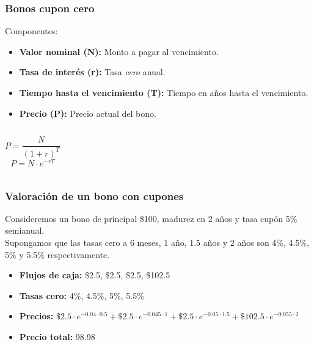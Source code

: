 
\begin{frame}
    \frametitle{Bonos cupon cero}
    Componentes:
    \begin{itemize}
        \item \textbf{Valor nominal (N):} Monto a pagar al vencimiento.
        \item \textbf{Tasa de interés (r):} Tasa \textit{cero} anual.
        \item \textbf{Tiempo hasta el vencimiento (T):} Tiempo en años hasta el vencimiento.
        \item \textbf{Precio (P):} Precio actual del bono.
    \end{itemize}
    \begin{columns}
            \begin{equation*}
                P = \frac{N}{(1+r)^T}
            \end{equation*}
            \begin{equation*}
                P = N \cdot e^{-rT}
            \end{equation*}
    \end{columns}
\end{frame}


\begin{frame}
    \frametitle{Valoración de un bono con cupones}
    Consideremos un bono de principal \$100, madurez en 2 años y tasa cupón 5\% semianual.\\
    Supongamos que las tasas cero a 6 meses, 1 año, 1.5 años y 2 años son 4\%, 4.5\%, 5\% y 5.5\% respectivamente.\\
    \begin{itemize}
        \item \textbf{Flujos de caja:} \$2.5, \$2.5, \$2.5, \$102.5
        \item \textbf{Tasas cero:} 4\%, 4.5\%, 5\%, 5.5\%
        \item \textbf{Precios:} $\$2.5 \cdot e^{-0.04 \cdot 0.5} + \$2.5 \cdot e^{-0.045 \cdot 1} + \$2.5 \cdot e^{-0.05 \cdot 1.5} + \$102.5 \cdot e^{-0.055 \cdot 2}$
        \item \textbf{Precio total:} 98.98
    \end{itemize}
\end{frame}

